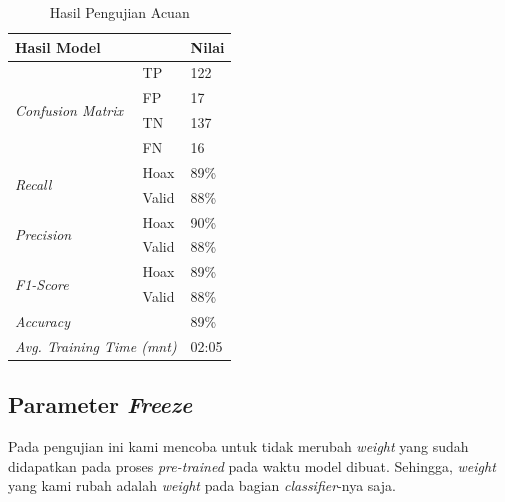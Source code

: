 \begin{table}[h]
    \caption{Hasil Pengujian Acuan}
    \label{tab: loss_baseline}
    \centering
    \begin{tabular}{|l|l|l|}
        \hline
        \multicolumn{2}{|l|}{\textbf{Hasil Model}}              & \textbf{Nilai}        \\ \hline
        \multirow{4}{*}{\textit{Confusion Matrix}}              & TP             & 122  \\ \cline{2-3}
                                                                & FP             & 17   \\ \cline{2-3}
                                                                & TN             & 137  \\ \cline{2-3}
                                                                & FN             & 16   \\ \hline
        \multirow{2}{*}{\textit{Recall}}                        & Hoax           & 89\% \\ \cline{2-3}
                                                                & Valid          & 88\% \\ \hline
        \multirow{2}{*}{\textit{Precision}}                     & Hoax           & 90\% \\ \cline{2-3}
                                                                & Valid          & 88\% \\ \hline
        \multirow{2}{*}{\textit{F1-Score}}                      & Hoax           & 89\% \\ \cline{2-3}
                                                                & Valid          & 88\% \\ \hline
        \multicolumn{2}{|l|}{\textit{Accuracy}}                 & 89\%                  \\ \hline
        \multicolumn{2}{|l|}{\textit{Avg. Training Time (mnt)}} & 02:05                 \\ \hline
    \end{tabular}
\end{table}



\subsection{Parameter \textit{Freeze}}

Pada pengujian ini kami mencoba untuk tidak merubah \textit{weight} yang sudah didapatkan pada proses \textit{pre-trained} pada waktu model dibuat. Sehingga, \textit{weight} yang kami rubah adalah \textit{weight} pada bagian \textit{classifier}-nya saja.


